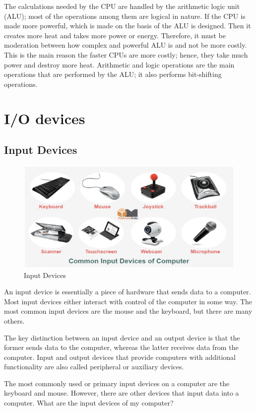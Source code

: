 \documentclass[11pt,a4paper,twoside]{article}
\begin{document}
The calculations needed by the CPU are handled by the arithmetic logic unit (ALU); most of the operations among them are logical in nature. If the CPU is made more powerful, which is made on the basis of the ALU is designed. Then it creates more heat and takes more power or energy. Therefore, it must be moderation between how complex and powerful ALU is and not be more costly. This is the main reason the faster CPUs are more costly; hence, they take much power and destroy more heat. Arithmetic and logic operations are the main operations that are performed by the ALU; it also performs bit-shifting operations.
\section{I/O devices}
\subsection{Input Devices}
\begin{figure}[H]
\includegraphics[width=1\textwidth]{Fig 13.jpg}
\caption{Input Devices}
\end{figure}
An input device is essentially a piece of hardware that sends data to a computer. Most input devices either interact with control of the computer in some way. The most common input devices are the mouse and the keyboard, but there are many others.\par
The key distinction between an input device and an output device is that the former sends data to the computer, whereas the latter receives data from the computer. Input and output devices that provide computers with additional functionality are also called peripheral or auxiliary devices.\par
The most commonly used or primary input devices on a computer are the keyboard and mouse. However, there are other devices that input data into a computer.  
\noindent What are the input devices of my computer?\par
\end{document}
